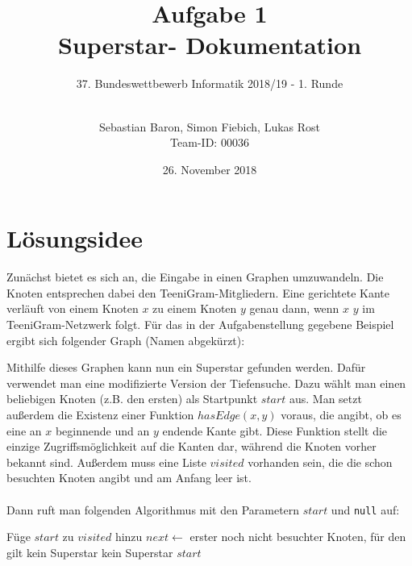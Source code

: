 \documentclass[a4paper, notitlepage, 12pt]{scrartcl}
\author{Sebastian Baron, Simon Fiebich, Lukas Rost \\ \small{Team-ID: 00036}}
\title{Aufgabe 1 \\ \glqq Superstar\grqq  - Dokumentation}
\subtitle{37. Bundeswettbewerb Informatik 2018/19 - 1. Runde \\~\\}
\date{26. November 2018}
\begin{document}
\renewcommand{\contentsname}{\centerline{Inhaltsverzeichnis}}
 \maketitle
 \tableofcontents
 \thispagestyle{empty}
 \newpage
 \setcounter{page}{1}

\section{Lösungsidee}
Zunächst bietet es sich an, die Eingabe in einen Graphen umzuwandeln. Die Knoten entsprechen dabei den TeeniGram-Mitgliedern. Eine gerichtete Kante verläuft von einem Knoten $x$ zu einem Knoten $y$ genau dann, wenn $x$ $y$ im TeeniGram-Netzwerk folgt.
Für das in der Aufgabenstellung gegebene Beispiel ergibt sich folgender Graph (Namen abgekürzt):
\begin{center}
\end{center}
Mithilfe dieses Graphen kann nun ein Superstar gefunden werden. Dafür verwendet man eine modifizierte Version der Tiefensuche. Dazu wählt man einen beliebigen Knoten (z.B. den ersten) als Startpunkt $start$ aus. Man setzt außerdem die Existenz einer Funktion $hasEdge(x,y)$ voraus, die angibt, ob es eine an $x$ beginnende und an $y$ endende Kante gibt. Diese Funktion stellt die einzige Zugriffsmöglichkeit auf die Kanten dar, während die Knoten vorher bekannt sind. Außerdem muss eine Liste $visited$ vorhanden sein, die die schon besuchten Knoten angibt und am Anfang leer ist. \\ \\
Dann ruft man folgenden Algorithmus mit den Parametern $start$ und \texttt{null} auf:
\begin{algorithmic}
    \State Füge $start$ zu $visited$ hinzu
    \State $next \gets$ erster noch nicht besuchter Knoten, für den  gilt
      \State \Return {}
    \Else
          \State \Return kein Superstar
        \EndIf
      \EndFor
          \State \Return kein Superstar
        \EndIf
      \EndFor
      \State \Return $start$
    \EndIf
  \EndFunction
\end{algorithmic}
\end{document}
